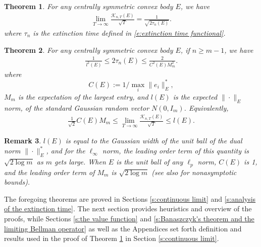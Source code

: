 \documentclass[reqno]{amsart}
\newtheorem{theorem}{Theorem}[section]
\newtheorem{remark}[theorem]{Remark}
\numberwithin{equation}{section}
\begin{document}
\begin{theorem}\label{t:main theorem}
For any centrally symmetric convex body $E$, we have
\begin{align*}
  \lim \limits_{T\to \infty}\frac{\mathcal{K}_{n,T}(E)}{\sqrt{T}} = \frac{1}{\sqrt{2\tau_n(E)}}.  
\end{align*}
where $\tau_n$ is the extinction time defined in \eqref{e:extinction time functional}.


\end{theorem}


\begin{theorem}\label{t:extinction time asymptotics}
For any centrally symmetric convex body $E$, if $n \geq m-1$, we have
\begin{align*}
  \frac{1}{\,l^2(E)} \leq 2\tau_n(E) \leq \frac{2}{  C^2(E) M^2_m }.
\end{align*}
 where
\[
C(E)  := 1/\max_i \| e_i\|^*_E,
\]
 $M_m$ is the expectation of the largest entry, and $ l(E)$ is the expected $\| \cdot\|_E$ norm,  of the standard  Gaussian random vector  $ N(0,I_m)$.
Equivalently, 
\begin{align*}
  \frac{ 1}{\sqrt{2}} C(E) M_m \leq \lim \limits_{T\to \infty}\frac{\mathcal{K}_{n,T}(E)}{\sqrt{T}} \leq l(E).    
\end{align*}
    
\end{theorem}

\begin {remark} \label{rem:gaussian_constants} $l(E)$ is equal to the Gaussian width of the unit ball of the dual norm $\|\cdot\|_E^*$, and for the $\ell_\infty$ norm, the leading order term of this quantity is  $\sqrt {2 \log {m}}$  as $m$ gets large. When $E$ is the unit ball of any  $\ell_p$ norm, $C(E)$ is 1, and the leading order term of $M_m$ is  $\sqrt {2 \log {m}} $ \cite[\S 2.3.2]{Galambos87} (see also \cite{dasgupta14, kamath98, orabona} for nonasymptotic bounds).   
\end {remark}






The foregoing theorems are proved in Sections \ref{s:continuous limit} and \ref{s:analysis of the extinction time}.  The next section provides heuristics and overview of the proofs, while Sections \ref{s:the value function} and \ref{s:Banaszczyk's theorem and the limiting Bellman operator} as well as the Appendices set forth definition and results used in the proof of Theorem \ref{t:main theorem} in Section \ref{s:continuous limit}. 
\end{document}
